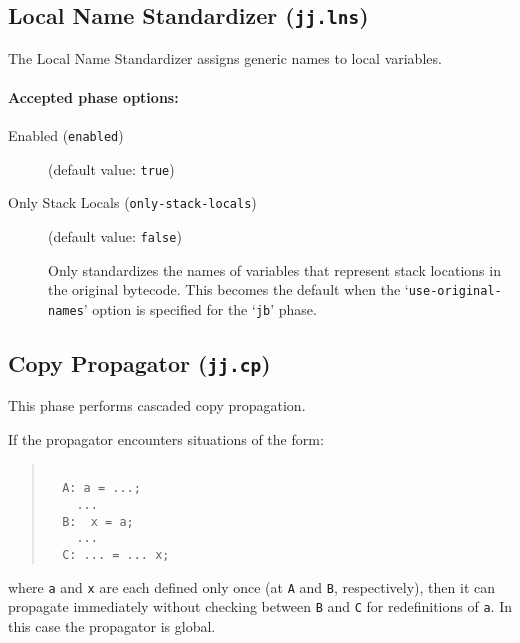 \documentclass{article}
\begin{document}
\subsection{Local Name Standardizer ({\tt jj.lns})}

The Local Name Standardizer assigns generic names to local variables.


\paragraph{Accepted phase options:} 

\begin{description}

\item[Enabled ({\tt enabled})]
(default value: {\tt true})






\item[Only Stack Locals ({\tt only-stack-locals})]
(default value: {\tt false})




Only standardizes the names of variables that represent stack
locations in the original bytecode. This becomes the default when
the `{\tt use-original-names}' option is specified for
the `{\tt jb}' phase.



\end{description}

\subsection{Copy Propagator ({\tt jj.cp})}

This phase performs cascaded copy propagation.  
    
If the propagator encounters situations of the form: 

\begin{quote}\begin{verbatim}

  A: a = ...; 
    ...
  B:  x = a;
    ...
  C: ... = ... x; 

\end{verbatim}\end{quote}

where {\tt a} and {\tt x} are each defined only once (at
{\tt A} and {\tt B}, respectively), then it can propagate
immediately without checking between {\tt B} and {\tt C}
for redefinitions of {\tt a}.  In
this case the propagator is global.
        
\end{document}
